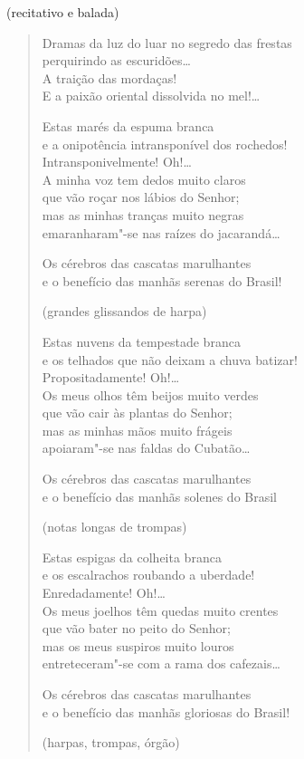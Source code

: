 \begin{flushright}
(recitativo e balada)
\end{flushright}

\begin{verse}
Dramas da luz do luar no segredo das frestas\\
perquirindo as escuridões\ldots{}\\
A traição das mordaças!\\
E a paixão oriental dissolvida no mel!\ldots{}

Estas marés da espuma branca\\
e a onipotência intransponível dos rochedos!\\
Intransponivelmente! Oh!\ldots{}\\
A minha voz tem dedos muito claros\\
que vão roçar nos lábios do Senhor;\\
mas as minhas tranças muito negras\\
emaranharam"-se nas raízes do jacarandá\ldots{}

Os cérebros das cascatas marulhantes\\
e o benefício das manhãs serenas do Brasil!

\hfill{}(grandes glissandos de harpa)

Estas nuvens da tempestade branca\\
e os telhados que não deixam a chuva batizar!\\
Propositadamente! Oh!\ldots{}\\
Os meus olhos têm beijos muito verdes\\
que vão cair às plantas do Senhor;\\
mas as minhas mãos muito frágeis\\
apoiaram"-se nas faldas do Cubatão\ldots{}

Os cérebros das cascatas marulhantes\\
e o benefício das manhãs solenes do Brasil

\hfill{}(notas longas de trompas)

Estas espigas da colheita branca\\
e os escalrachos roubando a uberdade!\\
Enredadamente! Oh!\ldots{}\\
Os meus joelhos têm quedas muito crentes\\
que vão bater no peito do Senhor;\\
mas os meus suspiros muito louros\\
entreteceram"-se com a rama dos cafezais\ldots{}

Os cérebros das cascatas marulhantes\\
e o benefício das manhãs gloriosas do Brasil!

\hfill{}(harpas, trompas, órgão)
\end{verse}

